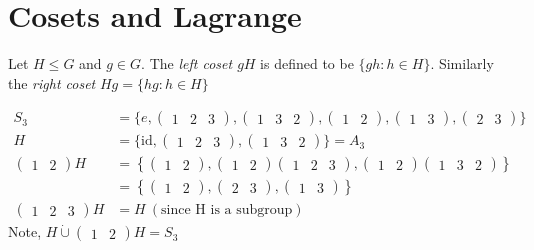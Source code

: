 \hypertarget{cosets-and-lagrange}{%
\section{Cosets and Lagrange}\label{cosets-and-lagrange}}

\begin{definition}[Cosets]
Let \(H \leq G\) and \(g \in G\).
The \emph{left coset \(gH\)} is defined to be \(\{ gh : h \in H \}\).
Similarly the \emph{right coset} \(Hg = \{ hg : h \in H \}\)
\end{definition}

\begin{example}
\begin{align*}
    S_3 &= \{ e, \begin{pmatrix}1 & 2 & 3\end{pmatrix}, \begin{pmatrix}1 & 3 & 2\end{pmatrix}, \begin{pmatrix}1 & 2\end{pmatrix}, \begin{pmatrix}1 & 3\end{pmatrix}, \begin{pmatrix}2 & 3\end{pmatrix} \} \\
    H &= \{ \text{id}, \begin{pmatrix}1 & 2 & 3\end{pmatrix}, \begin{pmatrix}1 & 3 & 2\end{pmatrix} \} = A_3 \\
    \begin{pmatrix}1 & 2\end{pmatrix}H &= \left\{ \begin{pmatrix}1 & 2\end{pmatrix}, \begin{pmatrix}1 & 2\end{pmatrix}\begin{pmatrix}1 & 2 & 3\end{pmatrix}, \begin{pmatrix}1 & 2\end{pmatrix}\begin{pmatrix}1 & 3 & 2\end{pmatrix} \right\} \\
    &= \left\{ \begin{pmatrix}1 & 2\end{pmatrix}, \begin{pmatrix}2 & 3\end{pmatrix}, \begin{pmatrix}1 & 3\end{pmatrix} \right\} \\
    \begin{pmatrix}1 & 2 & 3\end{pmatrix}H &= H \ (\text{since H is a subgroup})
\end{align*}
Note, \(H \mathbin{\dot{\cup}} \begin{pmatrix}1 & 2\end{pmatrix}H = S_3\)
\end{example}

